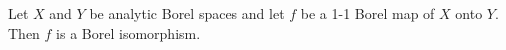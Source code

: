 Let $X$ and $Y$ be analytic Borel spaces and let $f$ be a 1-1 Borel map of $X$ onto $Y$. Then $f$ is a Borel isomorphism.
